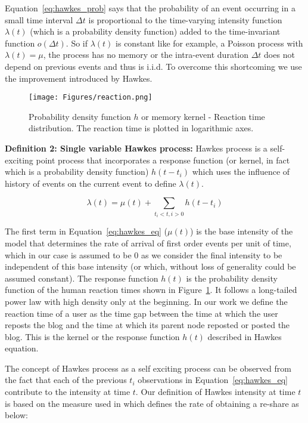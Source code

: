 \documentclass[smallextended]{svjour3}       %
\theoremstyle{definition}
\begin{document}
Equation~\ref{eq:hawkes_prob} says that the probability of an event occurring in a small time interval $\Delta t $ is proportional to the time-varying intensity function $\lambda(t) $ (which is a probability density function) added to the time-invariant function $o(\Delta t)$. So if $\lambda(t) $ is constant like for example, a Poisson process with $\lambda(t) = \mu $, the process has no memory or the intra-event duration  $\Delta t $ does not depend on previous events and thus is i.i.d. To overcome this shortcoming we use the improvement introduced by Hawkes.\\


\begin{figure}[H]
	\centering
	\texttt{[image: Figures/reaction.png]}
	\caption{Probability density function $h $ or memory kernel - Reaction time distribution. The reaction time is plotted in logarithmic axes.}
	\label{fig:pdf_hawkes}
\end{figure}

\textbf{Definition 2: Single variable Hawkes process:} Hawkes process is a self-exciting point process that incorporates a response function (or kernel, in fact which is a probability density function) $h(t-t_i)$ which uses the influence of history of events on the current event to define $\lambda (t) $.

\begin{equation}\label{eq:hawkes_eq}
\lambda(t) = \mu(t) + \sum \limits_{t_i<t, i>0}h(t-t_i)
\end{equation}

The first term in Equation~\ref{eq:hawkes_eq} ($ \mu (t) $) is the base intensity of the model that determines the rate of arrival of first order events per unit of time, which in our case is assumed to be 0 as we consider the final intensity to be independent of this  base intensity (or which, without loss of generality could be assumed constant). The response function $h(t) $ is the probability density function of the human reaction times shown in Figure~\ref{fig:pdf_hawkes}. It follows a long-tailed power law with high density only at the beginning. In our work we define the reaction time of a user as the time gap between the time at which the user reposts the blog and the time at which its parent node reposted or posted the blog. This is the kernel or the response function $h(t) $ described in Hawkes equation. 

The concept of Hawkes process as a self exciting process can be observed from the fact that each of the previous $t_i $ observations in Equation~\ref{eq:hawkes_eq}  contribute to the intensity at time $t$. Our definition of Hawkes intensity at time $t $ is based on the measure used in \cite{seismic} which defines the rate of obtaining a re-share as below:
\end{document}
